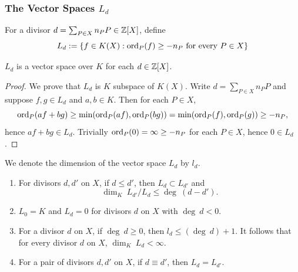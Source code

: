     \subsubsection{The Vector Spaces $L_d$}
    \begin{definition}
        For a divisor $d= \sum_{P\in X} n_P P\in \mathbb{Z}[X]$, define 
        $$
            L_d := \left\{ f\in K(X) : \mathrm{ord}_P(f) \geq -n_P \text{ for every } P \in X\right\}
        $$
    \end{definition}
    \begin{lemma}
        $L_d$ is a vector space over $K$ for each $d\in \mathbb{Z}[X]$. 
    \end{lemma}
    \begin{proof}
        We prove that $L_d$ is $K$ subspace of $K(X)$. Write $d = \sum_{P\in X} n_PP$ and suppose $f,g\in L_d$ and $a,b\in K$. Then for each $P\in X$,
        $$
            \mathrm{ord}_P(af+bg) \geq \min(\mathrm{ord}_P(af),\mathrm{ord}_P(bg)) = \min(\mathrm{ord}_P(f),\mathrm{ord}_P(g))\geq -n_P,
        $$ 
        hence $af+bg\in L_d$. Trivially $\mathrm{ord}_P(0)=\infty\geq -n_P$ for each $P\in X$, hence $0\in L_d$. 
    \end{proof}
    \begin{remark}
        We denote the dimension of the vector space $L_d$ by $l_d$. 
    \end{remark}
    \begin{lemma}\label{BasicDivisorVectSpaceLemma}
        \begin{enumerate}
            \item For divisors $d,d'$ on $X$, if $d\leq d'$, then $L_d\subset L_{d'}$ and 
            $$
                \dim_K \ L_{d'}/L_{d} \leq \deg \ (d-d').
            $$ 
            \item $L_0 = K$ and $L_d=0$ for divisors $d$ on $X$ with $\deg \ d < 0$.
            \item For a divisor $d$ on $X$, if $\deg \ d \geq 0$, then $l_d \leq (\deg \ d)+1$. It follows that for every divisor $d$ on $X$, $\dim_K \ L_d<\infty$.
            \item For a pair of divisors $d,d'$ on $X$, if $d\equiv d'$, then $L_d = L_{d'}$.   
        \end{enumerate}
    \end{lemma}
